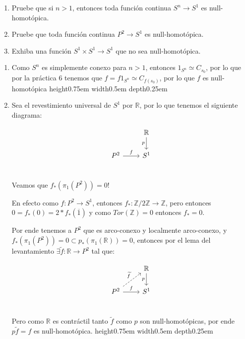 \documentclass[11pt]{article}
\newcommand{\R}{{\mathbb{R}}}
\newenvironment{proof}[1][Demostraci\'on]{\begin{trivlist}
\item[\hskip \labelsep {\bfseries #1}]}{\end{trivlist}}
\newcommand{\qed}{\nobreak \ifvmode \relax \else
      \ifdim\lastskip<1.5em \hskip-\lastskip
      \hskip1.5em plus0em minus0.5em \fi \nobreak
      \vrule height0.75em width0.5em depth0.25em\fi}
\newcommand{\Z}{\mathbb{Z}}
\def \be{\begin{enumerate}}
\def \en{\end{enumerate}}
\begin{document}
\medskip

\begin{enumerate}

\item {\be	\item Pruebe que si $n>1$, entonces toda funci\'on continua $S^n\to S^1$ es null-homot\'opica.
		\item Pruebe que toda funci\'on continua $P^2\to S^1$ es null-homot\'opica.
		\item Exhiba una funci\'on $S^1\times S^1\to S^1$ que no sea null-homot\'opica.
		\en}

\begin{proof}

\begin{enumerate}

\item Como $S^n$ es simplemente conexo para $n>1$, entonces $1_{S^n} \simeq C_{s_0}$, por lo que por la pr\'actica 6 tenemos que $f = f 1_{S^n} \simeq C_{f(s_0)}$, por lo que $f$ es null-homot\'opica \qed

\item Sea el revestimiento universal de $S^1$ por $\R$, por lo que tenemos el siguiente diagrama:

\[
\begin{tikzcd}
& \R \arrow[swap]{d}{p} \\
P^2 \arrow{r}{f} & S^1 \\
\end{tikzcd}
\]

Veamos que $f_*(\pi_1(P^2))=0 !$

En efecto como $f : P^2 \rightarrow S^1$, entonces $f_* : \Z / 2 \Z \rightarrow \Z$, pero entonces $0=f_*(0)=2*f_*(\overline{1})$ y como $Tor(\Z)=0$ entonces $f_* = 0$.

Por ende tenemos a $P^2$ que es arco-conexo y localmente arco-conexo, y $f_*(\pi_1(P^2)) = 0 \subset p_*(\pi_1(\R)) = 0$, entonces por el lema del levantamiento $\exists \widetilde{f} : \R \rightarrow P^2$ tal que:

\[
\begin{tikzcd}
& \R \arrow[swap]{d}{p} \\
P^2 \arrow{r}{f} \arrow[dashed]{ur}{\widetilde{f}} & S^1 \\
\end{tikzcd}
\]

Pero como $\R$ es contr\'actil tanto $\widetilde{f}$ como $p$ son null-homot\'opicas, por ende $p\widetilde{f}=f$ es null-homot\'opica. \qed


\end{enumerate}
\end{proof}
\end{enumerate}
\end{document}
